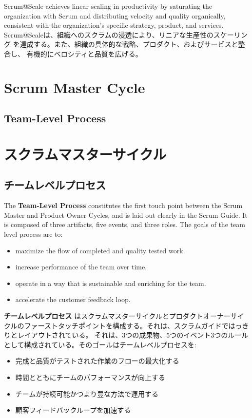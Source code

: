\documentclass[12pt,a4paper,parskip=full]{scrartcl}
\begin{document}
Scrum@Scale achieves linear scaling in productivity by saturating the
organization with Scrum and distributing velocity and quality organically,
consistent with the organization's specific strategy, product, and services.
\fi
Scrum@Scaleは、組織へのスクラムの浸透により、リニアな生産性のスケーリング
を達成する。また、組織の具体的な戦略、プロダクト、およびサービスと整合し、
有機的にベロシティと品質を広げる。

\section{Scrum Master Cycle}
\subsection{Team-Level Process}
\fi
\section{スクラムマスターサイクル}
\subsection{チームレベルプロセス}
The \textbf{Team-Level Process} constitutes the first touch point between the Scrum Master and Product Owner Cycles, and is laid out clearly in the Scrum Guide. It
is composed of three artifacts, five events, and three roles. The goals of
the team level process are to:
\begin{itemize}
\item maximize the flow of completed and quality tested work.
\item increase performance of the team over time.
\item operate in a way that is sustainable and enriching for the team.
\item accelerate the customer feedback loop.
\end{itemize}
\fi
\textbf{チームレベルプロセス} はスクラムマスターサイクルとプロダクトオーナーサイクルのファーストタッチポイントを構成する。それは、スクラムガイドではっきりとレイアウトされている。
それは、3つの成果物、5つのイベント3つのルールとして構成されている。そのゴールはチームレベルプロセスを:
\begin{itemize}
\item 完成と品質がテストされた作業のフローの最大化する
\item 時間とともにチームのパフォーマンスが向上する
\item チームが持続可能かつより豊な方法で運用する
\item 顧客フィードバックループを加速する
\end{itemize}
\end{document}
